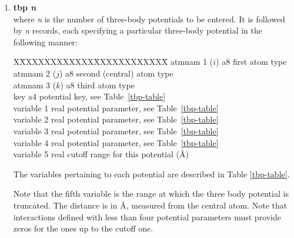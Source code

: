 \begin{enumerate}
\item {\bf tbp {\em n}} \\
where {\em n} is the number of three-body potentials to be
entered.  It is followed by {\em n} records, each specifying a
particular three-body potential in the following manner:
\begin{tabbing}
X\=XXXXXXXXXXXX\=XXXXXXXXXXXX\=\kill
\> atmnam 1 ($i$) \> a8   \> first atom type \\
\> atmnam 2 ($j$) \> a8   \> second (central) atom type \\
\> atmnam 3 ($k$) \> a8   \> third atom type \\
\> key            \> a4   \> potential key, see Table~\ref{tbp-table} \\
\> variable 1     \> real \> potential parameter, see Table~\ref{tbp-table} \\
\> variable 2     \> real \> potential parameter, see Table~\ref{tbp-table} \\
\> variable 3     \> real \> potential parameter, see Table~\ref{tbp-table} \\
\> variable 4     \> real \> potential parameter, see Table~\ref{tbp-table} \\
\> variable 5     \> real \> cutoff range for this potential (\AA)
\end{tabbing}
The variables pertaining to each potential are described in Table
\ref{tbp-table}.

Note that the fifth variable is the range at which the three
body potential is truncated.
The distance is in \AA, measured from the central atom.
Note that interactions defined with less than four potential
parameters must provide zeros for the ones up to the cutoff one.


\end{enumerate}
